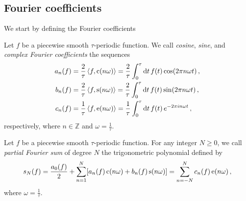 \subsection{Fourier coefficients}
We start by defining the Fourier coefficients
\begin{definition}
  \label{def:fourier-coef}
  Let $f$ be a piecewise smooth $\tau$-periodic function. We call
  \emph{cosine}, \emph{sine}, and \emph{complex Fourier coefficients} the sequences
  \begin{align}
    a_n(f)&=\frac{2}{\tau}\braket{f,\operatorname{c}(n\omega)}=\frac{2}{\tau}\int_0^{\tau}\mathrm{d} t\,f(t)\cos(2\pi n\omega t)\,,\\
    b_n(f)&=\frac{2}{\tau}\braket{f,\operatorname{s}(n\omega)}=\frac{2}{\tau}\int_0^{\tau}\mathrm{d} t\,f(t)\sin(2\pi n\omega t)\,,\\
    c_n(f)&=\frac{1}{\tau}\braket{f,\operatorname{e}(n\omega)}=\frac{1}{\tau}\int_0^{\tau}\mathrm{d} t\,f(t)\,e^{-2\pi i n\omega t}\,,
  \end{align}
  respectively, where $n\in\mathbb{Z}$ and $\omega=\frac{1}{\tau}$.
\end{definition}
\begin{definition}
  \label{def:fourier-partial}
  Let $f$ be a piecewise smooth $\tau$-periodic function. For any
  integer $N\geq 0$, we call \emph{partial Fourier sum} of degree $N$ the trigonometric
  polynomial defined by
  \begin{equation}
    s_N(f)=\frac{a_0(f)}{2}+\sum_{n=1}^N[a_n(f)\operatorname{c}(n\omega)+b_n(f)\operatorname{s}(n\omega)]=
    \sum_{n=-N}^{N}c_n(f)\operatorname{e}(n\omega)\,,
  \end{equation}
  where $\omega=\frac{1}{\tau}$.
\end{definition}
